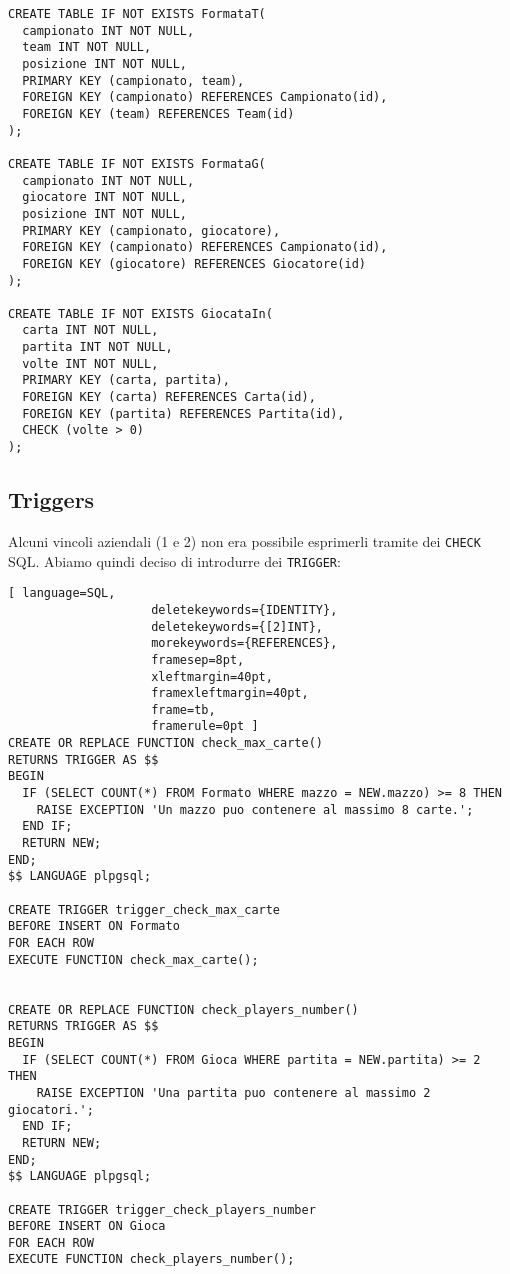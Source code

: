 \documentclass{article}
\begin{document}
\begin{lstlisting}
CREATE TABLE IF NOT EXISTS FormataT(
  campionato INT NOT NULL,
  team INT NOT NULL,
  posizione INT NOT NULL,
  PRIMARY KEY (campionato, team),
  FOREIGN KEY (campionato) REFERENCES Campionato(id),
  FOREIGN KEY (team) REFERENCES Team(id)
);

CREATE TABLE IF NOT EXISTS FormataG(
  campionato INT NOT NULL,
  giocatore INT NOT NULL,
  posizione INT NOT NULL,
  PRIMARY KEY (campionato, giocatore),
  FOREIGN KEY (campionato) REFERENCES Campionato(id),
  FOREIGN KEY (giocatore) REFERENCES Giocatore(id)
);

CREATE TABLE IF NOT EXISTS GiocataIn(
  carta INT NOT NULL,
  partita INT NOT NULL,
  volte INT NOT NULL,
  PRIMARY KEY (carta, partita),
  FOREIGN KEY (carta) REFERENCES Carta(id),
  FOREIGN KEY (partita) REFERENCES Partita(id),
  CHECK (volte > 0)
);
\end{lstlisting}

\subsection{Triggers}
Alcuni vincoli aziendali (1 e 2) non era possibile esprimerli tramite dei \texttt{CHECK} SQL. Abiamo quindi deciso di introdurre dei \texttt{TRIGGER}:
\begin{lstlisting}[ language=SQL,
                    deletekeywords={IDENTITY},
                    deletekeywords={[2]INT},
                    morekeywords={REFERENCES},
                    framesep=8pt,
                    xleftmargin=40pt,
                    framexleftmargin=40pt,
                    frame=tb,
                    framerule=0pt ]
CREATE OR REPLACE FUNCTION check_max_carte()
RETURNS TRIGGER AS $$
BEGIN
  IF (SELECT COUNT(*) FROM Formato WHERE mazzo = NEW.mazzo) >= 8 THEN
    RAISE EXCEPTION 'Un mazzo puo contenere al massimo 8 carte.';
  END IF;
  RETURN NEW;
END;
$$ LANGUAGE plpgsql;

CREATE TRIGGER trigger_check_max_carte
BEFORE INSERT ON Formato
FOR EACH ROW
EXECUTE FUNCTION check_max_carte();


CREATE OR REPLACE FUNCTION check_players_number()
RETURNS TRIGGER AS $$
BEGIN
  IF (SELECT COUNT(*) FROM Gioca WHERE partita = NEW.partita) >= 2 THEN
    RAISE EXCEPTION 'Una partita puo contenere al massimo 2 giocatori.';
  END IF;
  RETURN NEW;
END;
$$ LANGUAGE plpgsql;

CREATE TRIGGER trigger_check_players_number
BEFORE INSERT ON Gioca
FOR EACH ROW
EXECUTE FUNCTION check_players_number();
\end{lstlisting}
\end{document}
